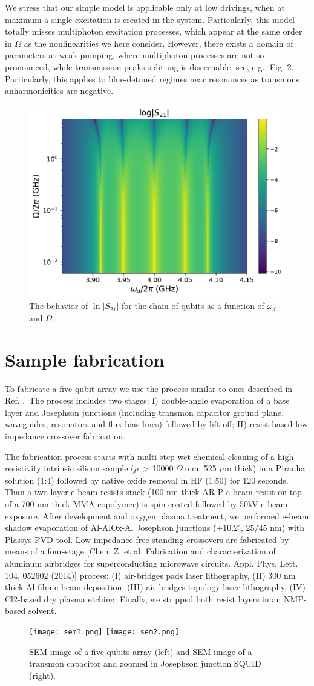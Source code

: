 \documentclass[%
 aps, pra,
 amsmath,amssymb,
 preprint,%
superscriptaddress
]{revtex4-2}
\begin{document}
We stress that our simple model is applicable only at low drivings, when at maximum a single excitation is created in the system. Particularly, this model totally misses multiphoton excitation processes, which appear at the same order in $\Omega$ as the nonlinearities we here consider. However, there exists a domain of parameters at weak pumping, where multiphoton processes are not so pronounced, while transmission peaks splitting is discernable, see, e.g., Fig. 2. Particularly, this applies to blue-detuned regimes near resonances as transmons anharmonicities are negative.

\begin{figure}
	\includegraphics[width=.5\linewidth]{map-s21-5qb2-w-log.pdf}
	\caption{The behavior of $\ln |S_{21}|$ for the chain of qubits as
		a function of $\omega_d$ and $\Omega$.}
	\label{fig:qubitchain}
\end{figure}

\section{Sample fabrication}

To fabricate a five-qubit array we use the process similar to ones described in Ref. \cite{fedorov2020}. The process includes two stages: I) double-angle evaporation of a base layer and Josephson junctions (including transmon capacitor ground plane, waveguides, resonators and flux bias lines) followed by lift-off; II) resist-based low impedance crossover fabrication. 

The fabrication process starts with multi-step wet chemical cleaning of a high-resistivity intrinsic silicon sample ($\rho$ > 10000 $\Omega\cdot$cm, 525 $\mu$m thick) in a Piranha solution (1:4) followed by native oxide removal in HF (1:50) for 120 seconds. Than a two-layer e-beam resists stack (100 nm thick AR-P e-beam resist on top of a 700 nm thick MMA copolymer) is spin coated followed by 50kV e-beam exposure. After development and oxygen plasma treatment, we performed e-beam shadow evaporation of Al-AlOx-Al Josephson junctions ($\pm$10.2$^\circ$, 25/45 nm) with Plassys PVD tool. Low impedance free-standing crossovers are fabricated by means of a four-stage [Chen, Z. et al. Fabrication and characterization of aluminum airbridges for superconducting microwave circuits. Appl. Phys. Lett. 104, 052602 (2014)] process: (I) air-bridges pads laser lithography, (II) 300 nm thick Al film e-beam deposition, (III) air-bridges topology laser lithography, (IV) Cl2-based dry plasma etching. Finally, we stripped both resist layers in an NMP-based solvent.

\begin{figure}
	\texttt{[image: sem1.png]}
		\texttt{[image: sem2.png]}
		\caption{SEM image of a five qubits array (left) and SEM image of a transmon capacitor and zoomed in Josephson junction SQUID (right). }
\end{figure}	


\end{document}
